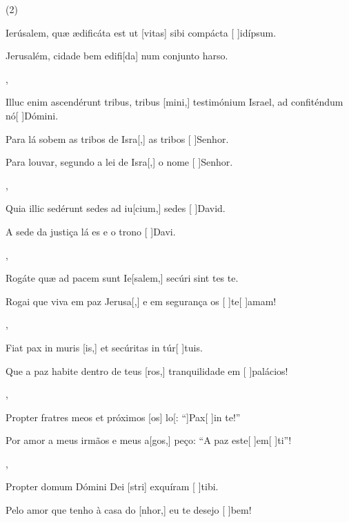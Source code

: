 \SetVersePairs(2){
  {\item {}Ierúsalem, quæ ædificáta est ut [vitas] sibi compácta [ ]{id}{íp}sum.~\Responsorium}%
    {\item {}Jerusalém, cidade bem edifi[da] num conjunto harso.~\Responsorium},
  {\item {}Illuc enim ascendérunt tribus, tribus [mini,] testimónium Israel, ad confiténdum nó[ ]{Dó}mini.~\Responsorium}%
    {\item {}Para lá sobem as tribos de Isra[,] as tribos [ ]{Se}{nhor}. \item {}Para louvar, segundo a lei de Isra[,] o nome [ ]{Se}{nhor}.~\Responsorium},
  {\item {}Quia illic sedérunt sedes ad iu[cium,] sedes [ ]{Da}\-vid.~\Responsorium}%
    {\item {}A sede da justiça lá es e o trono [ ]{Da}{vi}.~\Responsorium},
  {\item {}Rogáte quæ ad pacem sunt Ie[salem,] secúri sint \-tes te.~\Responsorium}%
    {\item {}Rogai que viva em paz Jerusa[,] e em segurança os [ ]{te}[ ]{a}mam!~\Responsorium},
  {\item {}Fiat pax in muris [is,] et secúritas in túr[ ]{tu}is.~\Responsorium}%
    {\item {}Que a paz habite dentro de teus [ros,] tranquilidade em [ ]{pa}{lá}cios!~\Responsorium},
  {\item {}Propter fratres meos et próximos [os] lo[: ``]{Pax}[ ]{in} te!''~\Responsorium}%
    {\item {}Por amor a meus irmãos e meus a[gos,] peço: ``A paz este[ ]{em}[ ]{ti}''!~\Responsorium},
  {\item {}Propter domum Dómini Dei [stri] exquíram [ ]{ti}bi.~\Responsorium}%
    {\item {}Pelo amor que tenho à casa do [nhor,] eu te desejo [ ]{bem}!~\Responsorium}
}